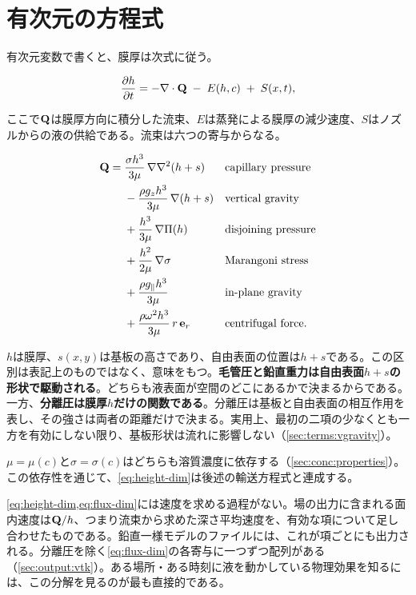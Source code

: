 \section{有次元の方程式}
\label{sec:governing:dimensional}

有次元変数で書くと、膜厚は次式に従う。

\begin{equation}\label{eq:height-dim}
  \frac{\partial h}{\partial t} = -\nabla\cdot\mathbf{Q} \;-\; E(h,c) \;+\; S(x,t),
\end{equation}

ここで$\mathbf{Q}$は膜厚方向に積分した流束、$E$は蒸発による膜厚の減少速度、$S$はノズルからの液の供給である。流束は六つの寄与からなる。

\begin{equation}\label{eq:flux-dim}
  \begin{aligned}
    \mathbf{Q} = {}& \frac{\sigma h^{3}}{3\mu}\,\nabla\nabla^{2}(h+s)
      && \text{capillary pressure} \\
      &{}- \frac{\rho g_z h^{3}}{3\mu}\,\nabla(h+s)
      && \text{vertical gravity} \\
      &{}+ \frac{h^{3}}{3\mu}\,\nabla\Pi(h)
      && \text{disjoining pressure} \\
      &{}+ \frac{h^{2}}{2\mu}\,\nabla\sigma
      && \text{Marangoni stress} \\
      &{}+ \frac{\rho g_\parallel h^{3}}{3\mu}
      && \text{in-plane gravity} \\
      &{}+ \frac{\rho \omega^{2} h^{3}}{3\mu}\,r\,\mathbf{e}_r
      && \text{centrifugal force.}
  \end{aligned}
\end{equation}

$h$は膜厚、$s(x,y)$は基板の高さであり、自由表面の位置は$h+s$である。この区別は表記上のものではなく、意味をもつ。\textbf{毛管圧と鉛直重力は自由表面$h+s$の形状で駆動される}。どちらも液表面が空間のどこにあるかで決まるからである。一方、\textbf{分離圧は膜厚$h$だけの関数である}。分離圧は基板と自由表面の相互作用を表し、その強さは両者の距離だけで決まる。実用上、最初の二項の少なくとも一方を有効にしない限り、基板形状は流れに影響しない（\cref{sec:terms:vgravity}）。

$\mu = \mu(c)$と$\sigma = \sigma(c)$はどちらも溶質濃度に依存する（\cref{sec:conc:properties}）。この依存性を通じて、\cref{eq:height-dim}は後述の輸送方程式と連成する。

\begin{note}[Yuzenが出力する速度は新たな未知量ではない]
  \cref{eq:height-dim,eq:flux-dim}には速度を求める過程がない。場の出力に含まれる面内速度は$\mathbf{Q}/h$、つまり流束から求めた深さ平均速度を、有効な項について足し合わせたものである。鉛直一様モデルのファイルには、これが項ごとにも出力される。分離圧を除く\cref{eq:flux-dim}の各寄与に一つずつ配列がある（\cref{sec:output:vtk}）。ある場所・ある時刻に液を動かしている物理効果を知るには、この分解を見るのが最も直接的である。
\end{note}

